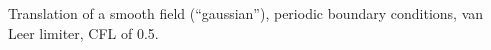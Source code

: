 Translation of a smooth field (``gaussian''), periodic boundary conditions, van Leer limiter, CFL of 0.5.
